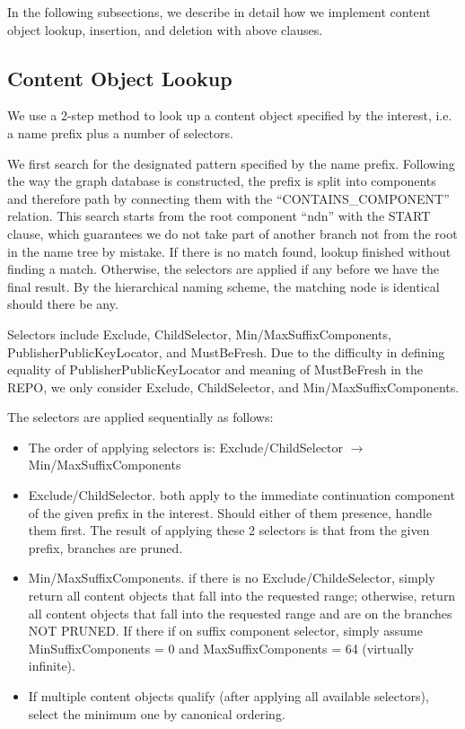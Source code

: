 In the following subsections, we describe in detail how we implement content object lookup, insertion, and deletion with above clauses.

\subsection{Content Object Lookup}

We use a 2-step method to look up a content object specified by the interest, i.e. a name prefix plus a number of selectors.

We first search for the designated pattern specified by the name prefix. Following the way the graph database is constructed, the prefix is split into components and therefore path by connecting them with the ``CONTAINS\_COMPONENT'' relation. This search starts from the root component ``ndn'' with the START clause, which guarantees we do not take part of another branch not from the root in the name tree by mistake. If there is no match found, lookup finished without finding a match. Otherwise, the selectors are applied if any before we have the final result. By the hierarchical naming scheme, the matching node is identical should there be any.

Selectors include Exclude, ChildSelector, Min/MaxSuffixComponents, PublisherPublicKeyLocator, and MustBeFresh. Due to the difficulty in defining equality of PublisherPublicKeyLocator and meaning of MustBeFresh in the REPO, we only consider Exclude, ChildSelector, and Min/MaxSuffixComponents.

The selectors are applied sequentially as follows:
\begin{itemize}
    \item The order of applying selectors is: Exclude/ChildSelector $\rightarrow$ Min/MaxSuffixComponents
    \item Exclude/ChildSelector. both apply to the immediate continuation component of the given prefix in the interest. Should either of them presence, handle them first. The result of applying these 2 selectors is that from the given prefix, branches are pruned.
    \item Min/MaxSuffixComponents. if there is no Exclude/ChildeSelector, simply return all content objects that fall into the requested range; otherwise, return all content objects that fall into the requested range and are on the branches NOT PRUNED. If there if on suffix component selector, simply assume MinSuffixComponents = 0 and MaxSuffixComponents = 64 (virtually infinite).
    \item If multiple content objects qualify (after applying all available selectors), select the minimum one by canonical ordering.
\end{itemize}

